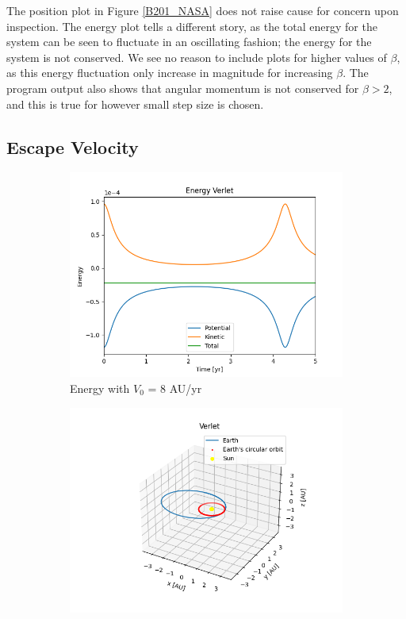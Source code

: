 	The position plot in Figure \ref{B201_NASA} does not raise cause for concern upon inspection. The energy plot tells a different story, as the total energy for the system can be seen to fluctuate in an oscillating fashion; the energy for the system is not conserved. We see no reason to include plots for higher values of $\beta$, as this energy fluctuation only increase in magnitude for increasing $\beta$. The program output also shows that angular momentum is not conserved for $\beta > 2$, and this is true for however small step size is chosen.
   
   \subsection{Escape Velocity}
   \begin{figure}[H]
		\centering
		\begin{subfigure}{0.48\linewidth}
			\includegraphics[width=1.2\linewidth]{Figure/EscVel_E_8.png}
			\caption{Energy with $V_0$ = 8 AU/yr}
		\end{subfigure}
		\begin{subfigure}{0.48\linewidth}
			\includegraphics[width=1.15\linewidth]{Figure/EscVel_P_8.png}

\end{subfigure}
\end{figure}
